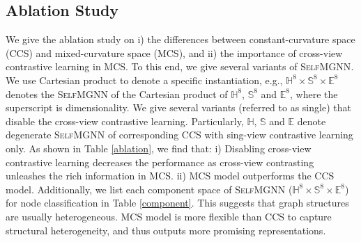 \subsection{Ablation Study} 
\vspace{-0.03in}
We give the ablation study on i) the differences between constant-curvature space (CCS) and mixed-curvature space (MCS), and 
ii) the importance of cross-view contrastive learning in MCS.
To this end, we give several variants of \textsc{SelfMGNN}.
We use Cartesian product to denote a specific instantiation, e.g., $\mathbb H^8 \times \mathbb S^8 \times \mathbb E^8$ denotes the \textsc{SelfMGNN} of the Cartesian product of $\mathbb H^8$, $\mathbb S^8$ and $\mathbb E^8$,  where the superscript is dimensionality.
We give several variants (referred to as single) that disable the cross-view contrastive learning.
Particularly, $\mathbb H$, $\mathbb S$ and $\mathbb E$ denote degenerate \textsc{SelfMGNN} of corresponding CCS with sing-view contrastive learning only.
As shown in Table \ref{ablation}, we find that: 
i) Disabling cross-view contrastive learning decreases the performance as cross-view contrasting unleashes the rich information in MCS.
ii) MCS model outperforms the CCS model. 
Additionally, we list each component space of \textsc{SelfMGNN} ($\mathbb H^8\times\mathbb S^8\times\mathbb E^8$) for node classification in Table \ref{component}.
This suggests that graph structures are usually heterogeneous. 
MCS model is more flexible than CCS to capture structural heterogeneity, and thus outputs more promising representations. 


















